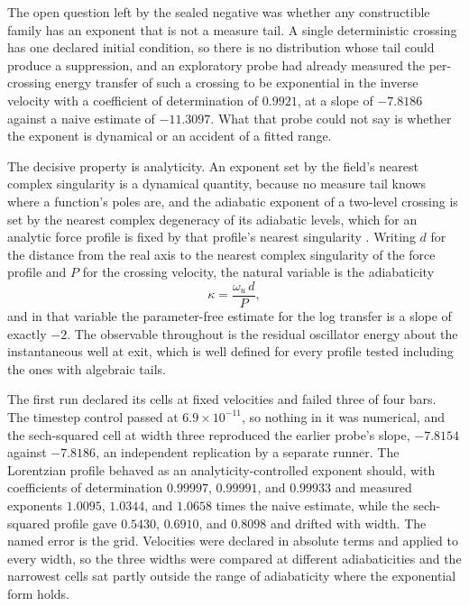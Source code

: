 \documentclass[aps,pre,reprint,nofootinbib,floatfix]{revtex4-2}
\begin{document}
The open question left by the sealed negative was whether any
constructible family has an exponent that is not a measure tail.  A
single deterministic crossing has one declared initial condition, so
there is no distribution whose tail could produce a suppression, and an
exploratory probe had already measured the per-crossing energy transfer
of such a crossing to be exponential in the inverse velocity with a
coefficient of determination of $0.9921$, at a slope of $-7.8186$
against a naive estimate of $-11.3097$.  What that probe could not say
is whether the exponent is dynamical or an accident of a fitted range.

The decisive property is analyticity.  An exponent set by the field's
nearest complex singularity is a dynamical quantity, because no measure
tail knows where a function's poles are, and the adiabatic exponent of
a two-level crossing is set by the nearest complex degeneracy of its
adiabatic levels, which for an analytic force profile is fixed by that
profile's nearest singularity
\cite{Dykhne1962, DavisPechukas1976}.  Writing $d$ for the
distance from the real axis to the nearest complex singularity of the
force profile and $P$ for the crossing velocity, the natural variable
is the adiabaticity
\begin{equation}
  \kappa = \frac{\omega_u\, d}{P},
  \label{eq:kappa}
\end{equation}
and in that variable the parameter-free estimate for the log transfer
is a slope of exactly $-2$.  The observable throughout is the residual
oscillator energy about the instantaneous well at exit, which is well
defined for every profile tested including the ones with algebraic
tails.

The first run declared its cells at fixed velocities and failed three
of four bars.  The timestep control passed at
$6.9 \times 10^{-11}$, so nothing in it was numerical, and the
sech-squared cell at width three reproduced the earlier probe's slope,
$-7.8154$ against $-7.8186$, an independent replication by a separate
runner.  The Lorentzian profile behaved as an analyticity-controlled
exponent should, with coefficients of determination $0.99997$,
$0.99991$, and $0.99933$ and measured exponents $1.0095$, $1.0344$, and
$1.0658$ times the naive estimate, while the sech-squared profile gave
$0.5430$, $0.6910$, and $0.8098$ and drifted with width.  The named
error is the grid.  Velocities were declared in absolute terms and
applied to every width, so the three widths were compared at different
adiabaticities and the narrowest cells sat partly outside the range of
adiabaticity where the exponential form holds.
\end{document}
